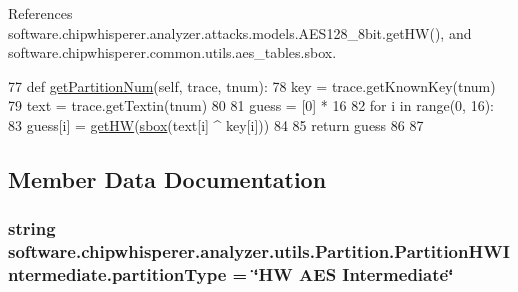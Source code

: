 References software.\+chipwhisperer.\+analyzer.\+attacks.\+models.\+A\+E\+S128\+\_\+8bit.\+get\+H\+W(), and software.\+chipwhisperer.\+common.\+utils.\+aes\+\_\+tables.\+sbox.


\begin{DoxyCode}
77     \textcolor{keyword}{def }\hyperlink{classsoftware_1_1chipwhisperer_1_1analyzer_1_1utils_1_1Partition_1_1PartitionHWIntermediate_a7fdfcecdae86b4ba7dd96b0db4117a0a}{getPartitionNum}(self, trace, tnum):
78         key = trace.getKnownKey(tnum)
79         text = trace.getTextin(tnum)
80 
81         guess = [0] * 16
82         \textcolor{keywordflow}{for} i \textcolor{keywordflow}{in} range(0, 16):
83             guess[i] = \hyperlink{namespacesoftware_1_1chipwhisperer_1_1analyzer_1_1attacks_1_1models_1_1AES128__8bit_ad7e775a7bb3510f159149dba221c7732}{getHW}(\hyperlink{namespacesoftware_1_1chipwhisperer_1_1common_1_1utils_1_1aes__tables_ab29ec75e9f1c27e4d0e14aa03b1558ba}{sbox}(text[i] ^ key[i]))
84 
85         \textcolor{keywordflow}{return} guess
86 
87 
\end{DoxyCode}


\subsection{Member Data Documentation}
\hypertarget{classsoftware_1_1chipwhisperer_1_1analyzer_1_1utils_1_1Partition_1_1PartitionHWIntermediate_ab3685355df59fcf1290498fe18e39afc}{}
\subsubsection[{partition\+Type}]{\setlength{\rightskip}{0pt plus 5cm}string software.\+chipwhisperer.\+analyzer.\+utils.\+Partition.\+Partition\+H\+W\+Intermediate.\+partition\+Type = \char`\"{}H\+W A\+E\+S Intermediate\char`\"{}\hspace{0.3cm}{\ttfamily [static]}}\label{classsoftware_1_1chipwhisperer_1_1analyzer_1_1utils_1_1Partition_1_1PartitionHWIntermediate_ab3685355df59fcf1290498fe18e39afc}
\hypertarget{classsoftware_1_1chipwhisperer_1_1analyzer_1_1utils_1_1Partition_1_1PartitionHWIntermediate_a2d76aa327194477fd5fedfb325696a37}{}
